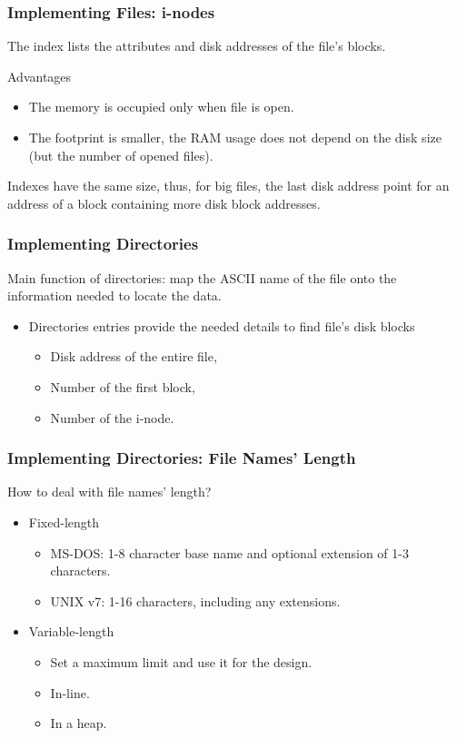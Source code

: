 \begin{frame}
    \frametitle{Implementing Files: i-nodes}
    The index lists the attributes and disk addresses of the file's blocks.
    \begin{block}{Advantages}
        \begin{itemize}
            \item The memory is occupied only when file is open.
            \item The footprint is smaller, the RAM usage does not depend on the disk size (but the number of opened files).
        \end{itemize}
    \end{block}
    Indexes have the same size, thus, for big files, the last disk address point for an address of a block containing more disk block addresses.
\end{frame}

\begin{frame}
    \frametitle{Implementing Directories}
    Main function of directories: map the ASCII name of the file onto the information needed to locate the data.
    \begin{itemize}
        \item Directories entries provide the needed details to find file's disk blocks
            \begin{itemize}
                \item Disk address of the entire file,
                \item Number of the first block,
                \item Number of the i-node.
            \end{itemize}
    \end{itemize}
\end{frame}

\begin{frame}
    \frametitle{Implementing Directories: File Names' Length}
    How to deal with file names' length?
    \begin{itemize}
        \item Fixed-length
        \begin{itemize}
            \item MS-DOS: 1-8 character base name and optional extension of 1-3 characters.
            \item UNIX v7: 1-16 characters, including any extensions.
        \end{itemize}
        \item Variable-length
        \begin{itemize}
            \item Set a maximum limit and use it for the design.
            \item In-line.
            \item In a heap.
        \end{itemize}
    \end{itemize}
\end{frame}


